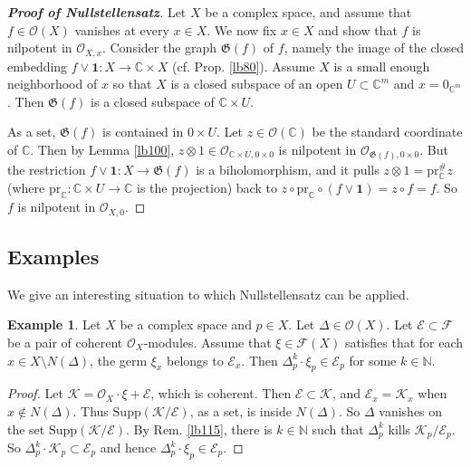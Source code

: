 \documentclass[12pt,b5paper,notitlepage]{report}
\theoremstyle{definition}
\newtheorem{eg}[df]{Example}
\theoremstyle{plain}
\newcommand{\fk}{\mathfrak}
\newcommand{\id}{\mathbf{1}}
\newcommand{\scr}{\mathscr}
\newcommand{\Cbb}{\mathbb C}
\newcommand{\Nbb}{\mathbb N}
\newcommand{\pr}{\mathrm {pr}}
\newcommand{\Supp}{\mathrm{Supp}}
\numberwithin{equation}{section}
\begin{document}
\begin{proof}[\textbf{Proof of Nullstellensatz}]
Let $X$ be a complex space, and assume that $f\in\scr O(X)$ vanishes at every $x\in X$. We now fix $x\in X$ and show that $f$ is nilpotent in $\scr O_{X,x}$. Consider the graph $\fk G(f)$ of $f$, namely the image of the closed embedding $f\vee \id:X\rightarrow \Cbb\times X$ (cf. Prop. \ref{lb80}). Assume $X$ is a small enough neighborhood of $x$ so that $X$ is a closed subspace of an open $U\subset\Cbb^m$ and $x=0_{\Cbb^m}$. Then $\fk G(f)$ is a closed subspace of $\Cbb\times U$. 

As a set, $\fk G(f)$ is contained in $0\times U$. Let $z\in\scr O(\Cbb)$ be the standard coordinate of $\Cbb$. Then by Lemma \ref{lb100}, $z\otimes 1\in\scr O_{\Cbb\times U,0\times 0}$ is nilpotent in $\scr O_{\fk G(f),0\times 0}$. But the restriction $f\vee\id:X\rightarrow\fk G(f)$ is a biholomorphism, and it pulls $z\otimes 1=\pr_\Cbb^\# z$ (where $\pr_\Cbb:\Cbb\times U\rightarrow\Cbb$ is the projection) back to $z\circ \pr_\Cbb\circ(f\vee\id)=z\circ f=f$. So $f$ is nilpotent in $\scr O_{X,0}$.
\end{proof}

\subsection{Examples}


We give an interesting situation to which Nullstellensatz can be applied.


\begin{eg}\label{lb389}
Let $X$ be a complex space and $p\in X$. Let $\varDelta\in\scr O(X)$.  Let $\scr E\subset\scr F$ be a pair of coherent $\scr O_X$-modules. Assume that $\xi\in\scr F(X)$ satisfies that for each $x\in X\setminus N(\varDelta)$, the germ $\xi_x$ belongs to $\scr E_x$. Then $\varDelta_p^k\cdot \xi_p\in\scr E_p$ for some $k\in\Nbb$. 
\end{eg}

\begin{proof}
Let $\scr K=\scr O_X\cdot \xi+\scr E$, which is coherent. Then $\scr E\subset\scr K$, and $\scr E_x=\scr K_x$ when $x\notin N(\Delta)$. Thus $\Supp(\scr K/\scr E)$, as a set, is inside $N(\varDelta)$. So $\varDelta$ vanishes on the set $\Supp(\scr K/\scr E)$. By Rem. \ref{lb115}, there is $k\in\Nbb$ such that $\varDelta_p^k$ kills $\scr K_p/\scr E_p$. So $\varDelta_p^k\cdot\scr K_p\subset\scr E_p$ and hence $\varDelta_p^k\cdot \xi_p\in\scr E_p$. 
\end{proof}
\end{document}
